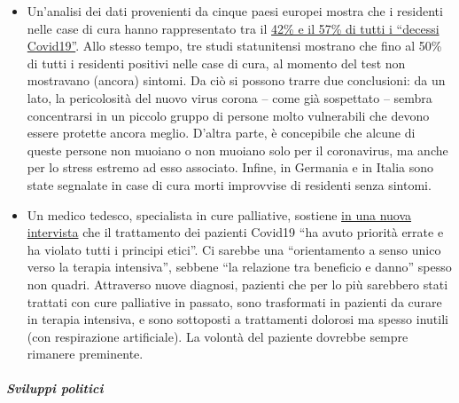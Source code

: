 \begin{itemize}
\tightlist
\item
  Un'analisi dei dati provenienti da cinque paesi europei mostra che i
  residenti nelle case di cura hanno rappresentato tra il
  \href{https://ltccovid.org/2020/04/12/mortality-associated-with-covid-19-outbreaks-in-care-homes-early-international-evidence/}{42\%
  e il 57\% di tutti i ``decessi Covid19''}. Allo stesso tempo, tre
  studi statunitensi mostrano che fino al 50\% di tutti i residenti
  positivi nelle case di cura, al momento del test non mostravano
  (ancora) sintomi. Da ciò si possono trarre due conclusioni: da un
  lato, la pericolosità del nuovo virus corona -- come già sospettato --
  sembra concentrarsi in un piccolo gruppo di persone molto vulnerabili
  che devono essere protette ancora meglio. D'altra parte, è concepibile
  che alcune di queste persone non muoiano o non muoiano solo per il
  coronavirus, ma anche per lo stress estremo ad esso associato. Infine,
  in Germania e in Italia sono state segnalate in case di cura morti
  improvvise di residenti senza sintomi.
\item
  Un medico tedesco, specialista in cure palliative, sostiene
  \href{https://www.deutschlandfunk.de/palliativmediziner-zu-covid-19-behandlungen-sehr-falsche.694.de.html?dram:article_id=474488}{in
  una nuova intervista} che il trattamento dei pazienti Covid19 ``ha
  avuto priorità errate e ha violato tutti i principi etici''. Ci
  sarebbe una ``orientamento a senso unico verso la terapia intensiva'',
  sebbene ``la relazione tra beneficio e danno'' spesso non quadri.
  Attraverso nuove diagnosi, pazienti che per lo più sarebbero stati
  trattati con cure palliative in passato, sono trasformati in pazienti
  da curare in terapia intensiva, e sono sottoposti a trattamenti
  dolorosi ma spesso inutili (con respirazione artificiale). La volontà
  del paziente dovrebbe sempre rimanere preminente.
\end{itemize}

\hypertarget{sviluppi-politici}{%
\subparagraph{\texorpdfstring{\textbf{Sviluppi
politici}}{Sviluppi politici}}\label{sviluppi-politici}}

